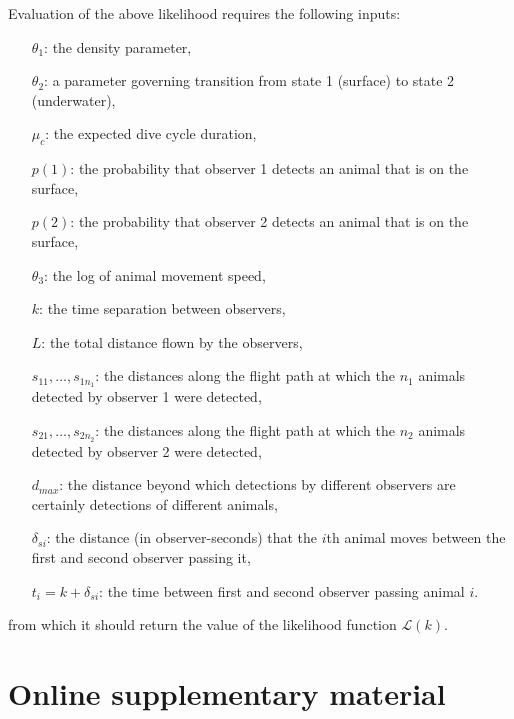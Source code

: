 \documentclass[useAMS, usenatbib, referee]{biom}
\begin{document}
Evaluation of the above likelihood requires the following inputs:

\begin{itemize}
\item[$\theta_1$:] the density parameter, 
\item[$\theta_2$:] a parameter governing transition from state 1 (surface) to state 2 (underwater),
\item[$\mu_c$:] the expected dive cycle duration,
\item[$p(1)$:] the probability that observer 1 detects an animal that is on the surface,
\item[$p(2)$:] the probability that observer 2 detects an animal that is on the surface,
\item[$\theta_3$:] the log of animal movement speed,
\item[$k$:] the time separation between observers,
\item[$L$:] the total distance flown by the observers,
\item[$s_{11},\ldots,s_{1n_1}$:] the distances along the flight path at which the $n_1$ animals detected by observer 1 were detected, 
\item[$s_{21},\ldots,s_{2n_2}$:] the distances along the flight path at which the $n_2$ animals detected by observer 2 were detected, 
\item[$d_{max}$:] the distance beyond which detections by different observers are certainly detections of different animals,
\item[$\delta_{si}$:] the distance (in observer-seconds) that the $i$th animal moves between the first and second observer passing it,\item[$t_i=k+\delta_{si}$:] the time between first and second observer passing animal $i$.
\end{itemize}

\noindent
from which it should return the value of the likelihood function $\mathcal{L}(k)$.





 


\newpage
\section*{Online supplementary material}
\end{document}

